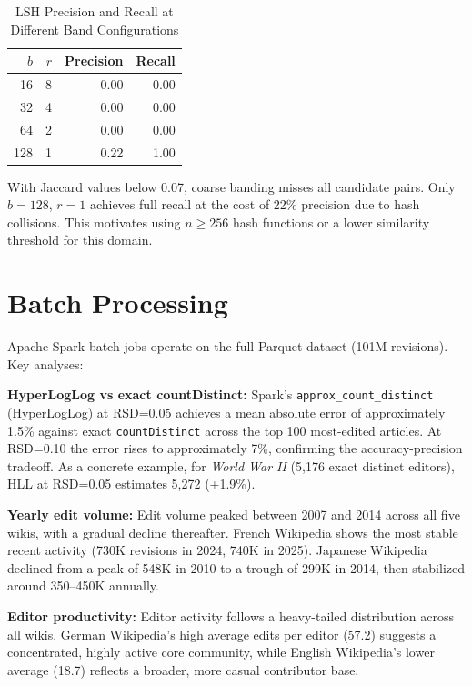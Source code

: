 \documentclass[conference]{IEEEtran}
\begin{document}
\begin{table}[htbp]
\caption{LSH Precision and Recall at Different Band Configurations}
\label{tab:lshpr}
\centering
\begin{tabular}{rrrr}
\toprule
$b$ & $r$ & Precision & Recall \\
\midrule
16  & 8 & 0.00 & 0.00 \\
32  & 4 & 0.00 & 0.00 \\
64  & 2 & 0.00 & 0.00 \\
128 & 1 & 0.22 & 1.00 \\
\bottomrule
\end{tabular}
\end{table}

With Jaccard values below 0.07, coarse banding misses all candidate pairs. Only $b=128$, $r=1$ achieves full recall at the cost of 22\% precision due to hash collisions. This motivates using $n \geq 256$ hash functions or a lower similarity threshold for this domain.

\section{Batch Processing}

Apache Spark batch jobs operate on the full Parquet dataset (101M revisions). Key analyses:

\textbf{HyperLogLog vs exact countDistinct:} Spark's \texttt{approx\_count\_distinct} (HyperLogLog) at RSD=0.05 achieves a mean absolute error of approximately 1.5\% against exact \texttt{countDistinct} across the top 100 most-edited articles. At RSD=0.10 the error rises to approximately 7\%, confirming the accuracy-precision tradeoff. As a concrete example, for \textit{World War II} (5,176 exact distinct editors), HLL at RSD=0.05 estimates 5,272 (+1.9\%).

\textbf{Yearly edit volume:} Edit volume peaked between 2007 and 2014 across all five wikis, with a gradual decline thereafter. French Wikipedia shows the most stable recent activity (730K revisions in 2024, 740K in 2025). Japanese Wikipedia declined from a peak of 548K in 2010 to a trough of 299K in 2014, then stabilized around 350--450K annually.

\textbf{Editor productivity:} Editor activity follows a heavy-tailed distribution across all wikis. German Wikipedia's high average edits per editor (57.2) suggests a concentrated, highly active core community, while English Wikipedia's lower average (18.7) reflects a broader, more casual contributor base.
\end{document}
